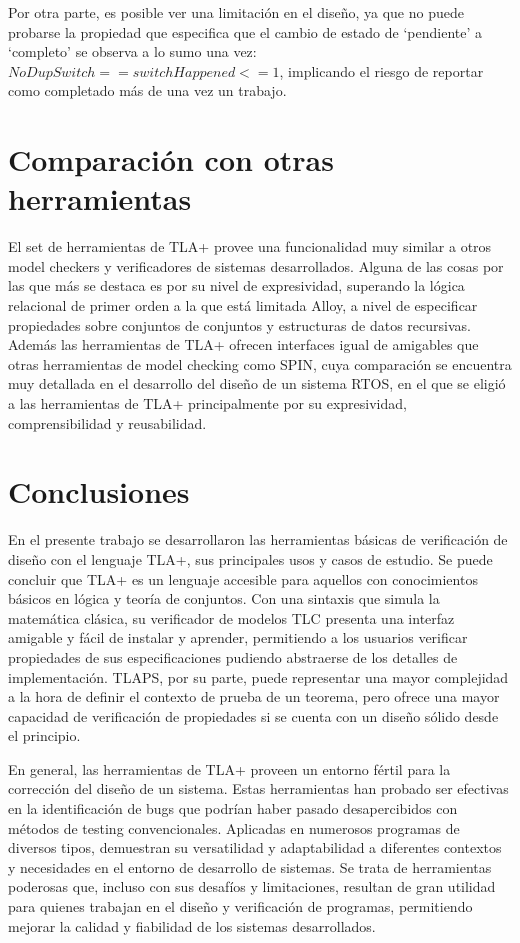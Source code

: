 \documentclass[runningheads]{llncs}
\begin{document}
Por otra parte, es posible ver una limitación en el diseño, ya que no puede probarse la propiedad que especifica que el cambio de estado de ‘pendiente’ a ‘completo’ se observa a lo sumo una vez: $NoDupSwitch == switchHappened <= 1$, implicando el riesgo de reportar como completado más de una vez un trabajo.

\section{Comparación con otras herramientas}
El set de herramientas de TLA+ provee una funcionalidad muy similar a otros model checkers y verificadores de sistemas desarrollados. Alguna de las cosas por las que más se destaca es por su nivel de expresividad, superando la lógica relacional de primer orden a la que está limitada Alloy, a nivel de especificar propiedades sobre conjuntos de conjuntos y estructuras de datos recursivas\cite{alloy}. Además las herramientas de TLA+ ofrecen interfaces igual de amigables que otras herramientas de model checking como SPIN, cuya comparación se encuentra muy detallada en el desarrollo del diseño de un sistema RTOS\cite{RTOS}, en el que se eligió a las herramientas de TLA+ principalmente por su expresividad, comprensibilidad y reusabilidad. 

\section{Conclusiones}


En el presente trabajo se desarrollaron las herramientas básicas de verificación de diseño con el lenguaje TLA+, sus principales usos y casos de estudio. Se puede concluir que TLA+ es un lenguaje accesible para aquellos con conocimientos básicos en lógica y teoría de conjuntos. Con una sintaxis que simula la matemática clásica, su verificador de modelos TLC presenta una interfaz amigable y fácil de instalar y aprender, permitiendo a los usuarios verificar propiedades de sus especificaciones pudiendo abstraerse de los detalles de implementación. TLAPS, por su parte, puede representar una mayor complejidad a la hora de definir el contexto de prueba de un teorema, pero ofrece una mayor capacidad de verificación de propiedades si se cuenta con un diseño sólido desde el principio.

En general, las herramientas de TLA+ proveen un entorno fértil para la corrección del diseño de un sistema. Estas herramientas han probado ser efectivas en la identificación de bugs que podrían haber pasado desapercibidos con métodos de testing convencionales. Aplicadas en numerosos programas de diversos tipos, demuestran su versatilidad y adaptabilidad a diferentes contextos y necesidades en el entorno de desarrollo de sistemas. Se trata de herramientas poderosas que, incluso con sus desafíos y limitaciones, resultan de gran utilidad para quienes trabajan en el diseño y verificación de programas, permitiendo mejorar la calidad y fiabilidad de los sistemas desarrollados.
\end{document}
